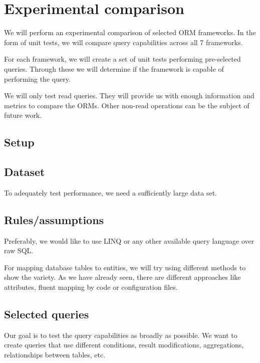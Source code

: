 \chapter{Experimental comparison}

We will perform an experimental comparison of selected ORM frameworks. In the form of unit tests, we will compare query capabilities across all 7 frameworks.

For each framework, we will create a set of unit tests performing pre-selected queries. Through these we will determine if the framework is capable of performing the query. 



We will only test read queries. They will provide us with enough information and metrics to compare the ORMs. Other non-read operations can be the subject of future work.

\section{Setup}


\section{Dataset}
To adequately test performance, we need a sufficiently large data set.

\section{Rules/assumptions} %
Preferably, we would like to use LINQ or any other available query language over raw SQL. 



For mapping database tables to entities, we will try using different methods to show the variety. 
As we have already seen, there are different approaches like attributes, fluent mapping by code or configuration files. 


\section{Selected queries}
Our goal is to test the query capabilities as broadly as possible. We want to create queries that use different conditions, result modifications, aggregations, relationships between tables, etc.

